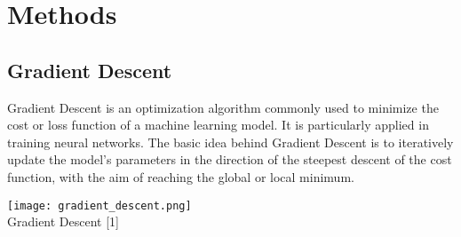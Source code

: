 \documentclass[conference]{IEEEtran}
\begin{document}
\section{\textbf{Methods}}

\subsection{Gradient Descent}
Gradient Descent is an optimization algorithm commonly used to minimize the cost or loss function of a machine learning model. It is particularly applied in training neural networks. The basic idea behind Gradient Descent is to iteratively update the model's parameters in the direction of the steepest descent of the cost function, with the aim of reaching the global or local minimum.

\begin{figure}[h]
    \centering
    \label{Gradient Descent}
\end{figure}

\begin{center}
    \texttt{[image: gradient\_descent.png]}\\ 
    \footnotesize{Gradient Descent [1]}
\end{center}\\ 
\end{document}
